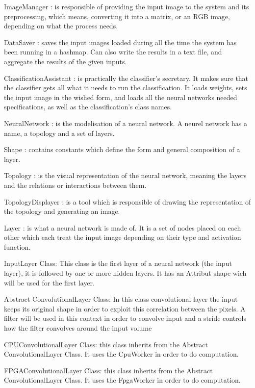 \documentclass[parskip=full]{scrartcl}
\begin{document}
ImageManager : is responsible of providing the input image to the system and its preprocessing, which means, converting it into a matrix, or an RGB image, depending on what the process needs.

DataSaver : saves the input images loaded during all the time the system has been running in a hashmap. Can also write the results in a text file, and aggregate the results of the given inputs.

ClassificationAssistant : is practically the classifier's secretary. It makes sure that the classifier gets all what it needs to run the classification. It loads weights, sets the input image in the wished form, and loads all the neural networks needed specifications, as well as the classification's class names.

NeuralNetwork : is the modelisation of a neural network. A neurel network has a name, a topology and a set of layers.

Shape : contains constants which define the form and general composition of a layer.

Topology : is the visual representation of the neural network, meaning the layers and the relations or interactions between them.

TopologyDisplayer : is a tool which is responsible of drawing the representation of the topology and generating an image.

Layer : is what a neural network is made of. It is a set of nodes placed on each other which each treat the input image depending on their type and activation function.




InputLayer Class: This class is the first layer of a neural network (the input layer), it is followed by one or more hidden layers.  It has an Attribut shape wich will be used for the first layer.

Abstract ConvolutionalLayer Class: In this class convolutional layer the input keeps its original shape in order to exploit this correlation between the pixels. A filter will be used in this context in order to convolve input and a stride controls how the filter convolves around the input volume

CPUConvolutionalLayer Class: this class inherits from the Abstract ConvolutionalLayer Class. It uses the CpuWorker in order to do computation.

FPGAConvolutionalLayer Class: this class inherits from the Abstract ConvolutionalLayer Class. It uses the FpgaWorker in order to do computation.
\end{document}
